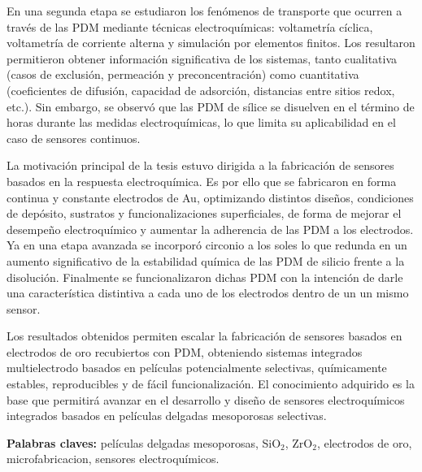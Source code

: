 En una segunda etapa se estudiaron los fenómenos de transporte que ocurren a través de las PDM mediante técnicas electroquímicas: voltametría cíclica, voltametría de corriente alterna y simulación por elementos finitos. Los resultaron permitieron obtener información significativa de los sistemas, tanto cualitativa (casos de exclusión, permeación y preconcentración) como cuantitativa (coeficientes de difusión, capacidad de adsorción, distancias entre sitios redox, etc.). Sin embargo, se observó que las PDM de sílice se disuelven en el término de horas durante las medidas electroquímicas, lo que limita su aplicabilidad en el caso de sensores continuos.

La motivación principal de la tesis estuvo dirigida a la fabricación de sensores basados en la respuesta electroquímica. Es por ello que se fabricaron en forma continua y constante electrodos de Au, optimizando distintos diseños, condiciones de depósito, sustratos y funcionalizaciones superficiales, de forma de mejorar el desempeño electroquímico y aumentar la adherencia de las PDM a los electrodos. Ya en una etapa avanzada se incorporó circonio a los soles lo que redunda en un aumento significativo de la estabilidad química de las PDM de silicio frente a la disolución. Finalmente se funcionalizaron dichas PDM con la intención de darle una característica distintiva a cada uno de los electrodos dentro de un un mismo sensor.

Los resultados obtenidos permiten escalar la fabricación de sensores basados en electrodos de oro recubiertos con PDM, obteniendo sistemas integrados multielectrodo basados en películas potencialmente selectivas, químicamente estables, reproducibles y de fácil funcionalización. El conocimiento adquirido es la base que permitirá avanzar en el desarrollo y diseño de sensores electroquímicos integrados basados en películas delgadas mesoporosas selectivas. 
\vspace*{\fill}

\vfill

\noindent\textbf{Palabras claves:} películas delgadas mesoporosas, SiO$_2$, ZrO$_2$, electrodos de oro, microfabricacion, sensores electroquímicos.

\cleardoublepage
